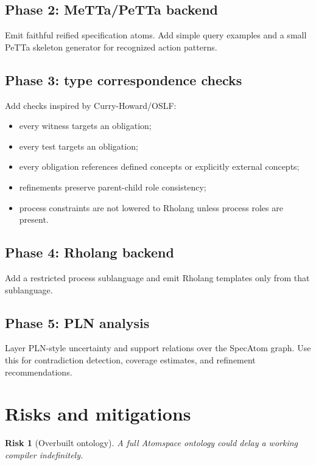 \documentclass[11pt]{article}
\newtheorem{risk}{Risk}
\begin{document}
\subsection{Phase 2: MeTTa/PeTTa backend}

Emit faithful reified specification atoms. Add simple query examples and a small
PeTTa skeleton generator for recognized action patterns.

\subsection{Phase 3: type correspondence checks}

Add checks inspired by Curry-Howard/OSLF:

\begin{itemize}[nosep]
\item every witness targets an obligation;
\item every test targets an obligation;
\item every obligation references defined concepts or explicitly external
concepts;
\item refinements preserve parent-child role consistency;
\item process constraints are not lowered to Rholang unless process roles are
present.
\end{itemize}

\subsection{Phase 4: Rholang backend}

Add a restricted process sublanguage and emit Rholang templates only from that
sublanguage.

\subsection{Phase 5: PLN analysis}

Layer PLN-style uncertainty and support relations over the SpecAtom graph. Use
this for contradiction detection, coverage estimates, and refinement
recommendations.

\section{Risks and mitigations}

\begin{risk}[Overbuilt ontology]
A full Atomspace ontology could delay a working compiler indefinitely.
\end{risk}
\end{document}
